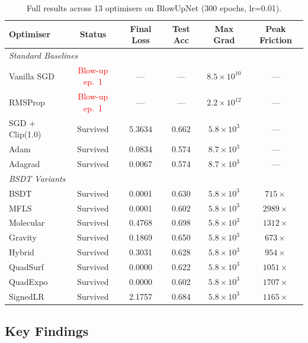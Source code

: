\documentclass[11pt,a4paper]{article}
\begin{document}
\begin{table}[H]
\centering
\caption{Full results across 13 optimisers on BlowUpNet (300 epochs, lr=0.01).}
\label{tab:results}
\begin{tabular}{@{}lccccc@{}}
\toprule
\textbf{Optimiser} & \textbf{Status} & \textbf{Final Loss} & \textbf{Test Acc} & \textbf{Max Grad} & \textbf{Peak Friction} \\
\midrule
\multicolumn{6}{l}{\textit{Standard Baselines}} \\
Vanilla SGD    & \textcolor{red}{Blow-up ep.\ 1}  & ---       & ---   & $8.5 \times 10^{10}$ & --- \\
RMSProp        & \textcolor{red}{Blow-up ep.\ 1}  & ---       & ---   & $2.2 \times 10^{12}$ & --- \\
SGD + Clip(1.0)& Survived          & 5.3634    & 0.662 & $5.8 \times 10^{3}$  & --- \\
Adam           & Survived          & 0.0834    & 0.574 & $8.7 \times 10^{3}$  & --- \\
Adagrad        & Survived          & 0.0067    & 0.574 & $8.7 \times 10^{3}$  & --- \\
\midrule
\multicolumn{6}{l}{\textit{BSDT Variants}} \\
BSDT           & Survived          & 0.0001    & 0.630 & $5.8 \times 10^{3}$  & $715\times$ \\
MFLS           & Survived          & 0.0001    & 0.602 & $5.8 \times 10^{3}$  & $2989\times$ \\
Molecular      & Survived          & 0.4768    & 0.698 & $5.8 \times 10^{3}$  & $1312\times$ \\
Gravity        & Survived          & 0.1869    & 0.650 & $5.8 \times 10^{3}$  & $673\times$ \\
Hybrid         & Survived          & 0.3031    & 0.628 & $5.8 \times 10^{3}$  & $954\times$ \\
QuadSurf       & Survived          & 0.0000    & 0.622 & $5.8 \times 10^{3}$  & $1051\times$ \\
QuadExpo       & Survived          & 0.0000    & 0.602 & $5.8 \times 10^{3}$  & $1707\times$ \\
SignedLR       & Survived          & 2.1757    & 0.684 & $5.8 \times 10^{3}$  & $1165\times$ \\
\bottomrule
\end{tabular}
\end{table}

\subsection{Key Findings}
\end{document}
